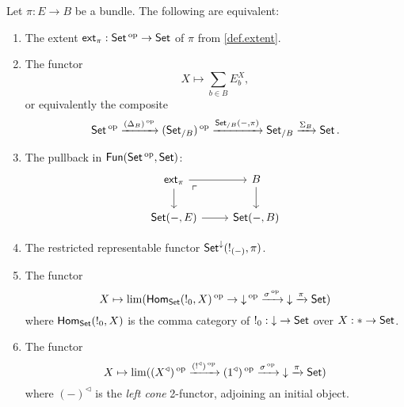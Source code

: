 \begin{prop}\label{prop:set.characterizing.extent}
  Let $\pi : E \to B$ be a bundle. The following are equivalent:
  \begin{enumerate}
  \item The extent $\ext_{\pi} : \Set\op \to \Set$ of $\pi$ from \cref{def.extent}.
  \item The functor
    $$X \mapsto \sum_{b \in B} E_b^X,$$
    or equivalently the composite
  $$\Set\op \xto{(\Delta_B)\op} (\Set_{/B})\op \xto{\Set_{/B}(-, \pi)} \Set_{/B}
  \xto{\Sigma_B} \Set.$$
\item The pullback in $\Fun(\Set\op, \Set)$:  
\[
\begin{tikzcd}
	\ext_\pi \ar[r]\ar[d]\arrow[dr, phantom,
      "\ulcorner" very near start]&
	B\ar[d]\\
	\Set(-,E)\ar[r]&
	\Set(-,B)
\end{tikzcd}
\]
\item The restricted representable functor
  $\Set^{\down}(!_{(-)}, \pi)$.
\item The functor
  $$X \mapsto \lim(\Hom_{\Set}(!_0, X)\op \to \down\op \xto{\sigma\op} \down \xto{\pi} \Set)$$
  where $\Hom_{\Set}(!_0, X)$ is the comma category of $!_0 : \down \to
  \Set$ over $X:\ast\to\Set$.
\item The functor
  $$X \mapsto \lim(( X^{\triangleleft} )\op \xto{( !^{\triangleleft} )\op}
  (1^{\triangleleft})\op \xto{\sigma\op} \down
  \xto{\pi} \Set)$$
  where $(-)^{\triangleleft}$ is the \emph{left cone} 2-functor, adjoining an initial object.
  \end{enumerate}
\end{prop}

